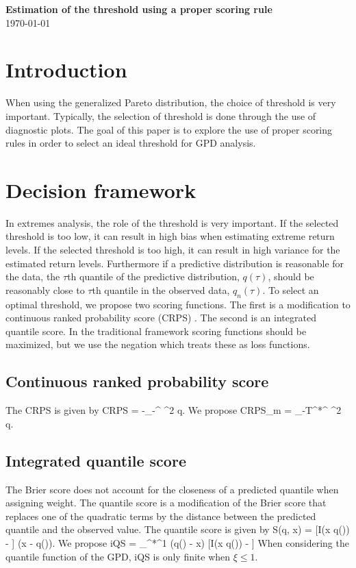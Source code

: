 \documentclass[11pt]{article}
\begin{document}
\linenumbers

\begin{center}
{\Large {\bf Estimation of the threshold using a proper scoring rule}}\\
\today
\end{center}

\section{Introduction}\label{s:intro}
When using the generalized Pareto distribution, the choice of threshold is very important.
Typically, the selection of threshold is done through the use of diagnostic plots.
The goal of this paper is to explore the use of proper scoring rules in order to select an ideal threshold for GPD analysis.

\section{Decision framework}\label{s:framework}
In extremes analysis, the role of the threshold is very important.
If the selected threshold is too low, it can result in high bias when estimating extreme return levels.
If the selected threshold is too high, it can result in high variance for the estimated return levels.
Furthermore if a predictive distribution is reasonable for the data, the $\tau$th quantile of the predictive distribution, $q(\tau)$, should be reasonably close to $\tau$th quantile in the observed data, $q_n(\tau)$.
To select an optimal threshold, we propose two scoring functions.
The first is a modification to continuous ranked probability score (CRPS) \citep{Gneiting2007}. 
The second is an integrated quantile score.
In the traditional framework scoring functions should be maximized, but we use the negation which treats these as loss functions.

\subsection{Continuous ranked probability score}
The CRPS \citep{Gneiting2007} is given by
\beqn
    CRPS = -\int_{-\infty}^{\infty} ^2 q.
\eeqn
We propose
\beqn
    CRPS_m = \int_{-T^*}^{\infty} ^2 q.
\eeqn

\subsection{Integrated quantile score}
The Brier score does not account for the closeness of a predicted quantile when assigning weight.
The quantile score \citep{Gneiting2007} is a modification of the Brier score that replaces one of the quadratic terms by the distance between the predicted quantile and the observed value.
The quantile score is given by
\beqn
    S(q, x) = [I(x \le q(\tau)) - \tau] (x - q(\tau)).
\eeqn
We propose
\beqn
    iQS = \int_{\tau^*}^1 (q(\tau) - x) [I(x \le q(\tau)) - \tau] \tau
\eeqn
When considering the quantile function of the GPD, iQS is only finite when $\xi \le 1$.
\end{document}
